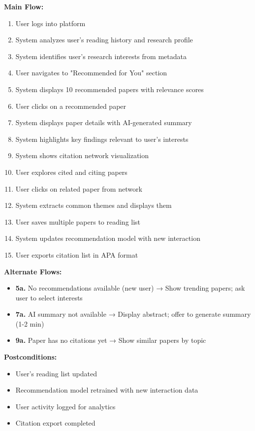 \documentclass[12pt,a4paper]{report}
\begin{document}
\textbf{Main Flow:}
\begin{enumerate}
    \item User logs into platform
    \item System analyzes user's reading history and research profile
    \item System identifies user's research interests from metadata
    \item User navigates to "Recommended for You" section
    \item System displays 10 recommended papers with relevance scores
    \item User clicks on a recommended paper
    \item System displays paper details with AI-generated summary
    \item System highlights key findings relevant to user's interests
    \item System shows citation network visualization
    \item User explores cited and citing papers
    \item User clicks on related paper from network
    \item System extracts common themes and displays them
    \item User saves multiple papers to reading list
    \item System updates recommendation model with new interaction
    \item User exports citation list in APA format
\end{enumerate}

\textbf{Alternate Flows:}
\begin{itemize}
    \item \textbf{5a.} No recommendations available (new user) → Show trending papers; ask user to select interests
    \item \textbf{7a.} AI summary not available → Display abstract; offer to generate summary (1-2 min)
    \item \textbf{9a.} Paper has no citations yet → Show similar papers by topic
\end{itemize}

\textbf{Postconditions:}
\begin{itemize}
    \item User's reading list updated
    \item Recommendation model retrained with new interaction data
    \item User activity logged for analytics
    \item Citation export completed
\end{itemize}
\end{document}
